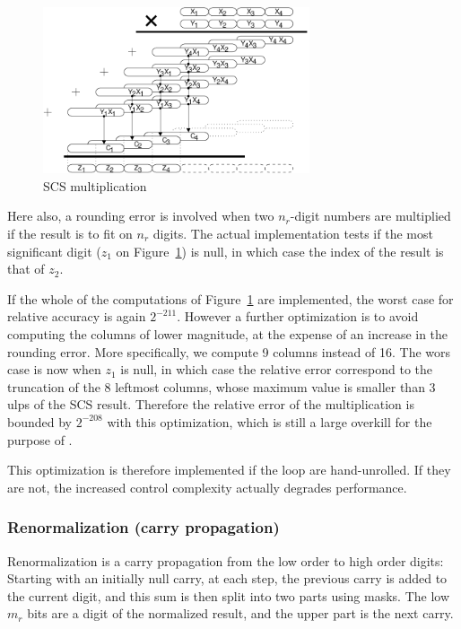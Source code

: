 \begin{figure}[h]
\begin{center}
\includegraphics[width=0.7\textwidth]{fig_scs/multiplication}
\caption{SCS multiplication \label{fig:scsmultiplication}}
\end{center}
\end{figure}

Here also, a rounding error is involved when two $n_r$-digit numbers
are multiplied if the result is to fit on $n_r$ digits. The actual
implementation tests if the most significant digit ($z_1$ on
Figure~\ref{fig:scsmultiplication}) is null, in which case the index of
the result is that of $z_2$.

If the whole of the computations of
Figure~\ref{fig:scsmultiplication} are implemented, the worst case
for relative accuracy is again $2^{-211}$. However a further
optimization is to avoid computing the columns of lower magnitude, at
the expense of an increase in the rounding error. More specifically,
we compute 9 columns instead of 16.  The wors case is now when $z_1$
is null, in which case the relative error correspond to the truncation
of the 8 leftmost columns, whose maximum value is smaller than 3 ulps
of the SCS result. Therefore the relative error of the multiplication
is bounded by $2^{-208}$ with this optimization, which is still a
large overkill for the purpose of \crlibm.

This optimization is therefore implemented if the loop are hand-unrolled.
If they are not, the increased control complexity actually degrades
performance.


\subsubsection{Renormalization (carry propagation) \label{renorm}}

Renormalization is a carry propagation from the low order to high
order digits: Starting with an initially null carry, at each step, the
previous carry is added to the current digit, and this sum is then
split into two parts using masks. The low $m_r$ bits are a digit of
the normalized result, and the upper part is the next carry.


